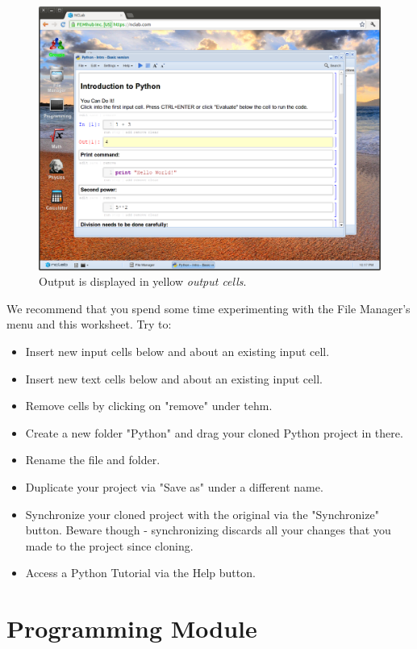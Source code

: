 \documentclass[article,A4,12pt]{llncs}
\begin{document}
\begin{figure}[!ht]
\begin{center}
\includegraphics[width=\textwidth]{img/fileman5.png}
\end{center}
\caption{Output is displayed in yellow {\em output cells}.}
\label{fig:fileman5}
\end{figure}
\noindent
We recommend that you spend some time experimenting with the 
File Manager's menu and this worksheet. Try to:
\begin{itemize}
\item Insert new input cells below and about an existing input cell.
\item Insert new text cells below and about an existing input cell.
\item Remove cells by clicking on "remove" under tehm.
\item Create a new folder "Python" and drag your cloned Python 
      project in there. 
\item Rename the file and folder.
\item Duplicate your project via "Save as" under a different name.
\item Synchronize your cloned project with the original via the 
      "Synchronize" button. Beware though - synchronizing discards 
      all your changes that you made to the project since cloning. 
\item Access a Python Tutorial via the Help button.
\end{itemize}

\section{Programming Module}
\end{document}
